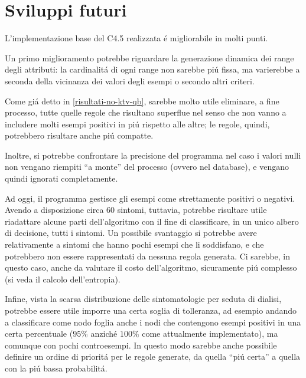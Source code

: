 \documentclass[preprint]{acm_proc_article-sp}
\begin{document}
\section{Sviluppi futuri}
\label{sviluppi-futuri}
L'implementazione base del C4.5 realizzata \'e migliorabile in molti punti.

Un primo miglioramento potrebbe riguardare la generazione dinamica dei range degli attributi: la cardinalit\'a di ogni range non sarebbe pi\'u fissa, ma varierebbe a seconda della vicinanza dei valori degli esempi o secondo altri criteri.

Come gi\'a detto in \ref{risultati-no-ktv-qb}, sarebbe molto utile eliminare, a fine processo, tutte quelle regole che risultano superflue nel senso che non vanno a includere molti esempi positivi in pi\'u rispetto alle altre; le regole, quindi, potrebbero risultare anche pi\'u compatte.

Inoltre, si potrebbe confrontare la precisione del programma nel caso i valori nulli non vengano riempiti ``a monte'' del processo (ovvero nel database), e vengano quindi ignorati completamente.

Ad oggi, il programma gestisce gli esempi come strettamente positivi o negativi. Avendo a disposizione circa $60$ sintomi, tuttavia, potrebbe risultare utile riadattare alcune parti dell'algoritmo con il fine di classificare, in un unico albero di decisione, tutti i sintomi. Un possibile svantaggio si potrebbe avere relativamente a sintomi che hanno pochi esempi che li soddisfano, e che potrebbero non essere rappresentati da nessuna regola generata. Ci sarebbe, in questo caso, anche da valutare il costo dell'algoritmo, sicuramente pi\'u complesso (si veda il calcolo dell'entropia).

Infine, vista la scarsa distribuzione delle sintomatologie per seduta di dialisi, potrebbe essere utile imporre una certa soglia di tolleranza, ad esempio andando a classificare come nodo foglia anche i nodi che contengono esempi positivi in una certa percentuale ($95\%$ anzich\'e $100\%$ come attualmente implementato), ma comunque con pochi controesempi. In questo modo sarebbe anche possibile definire un ordine di priorit\'a per le regole generate, da quella ``pi\'u certa'' a quella con la pi\'u bassa probabilit\'a.
\end{document}
